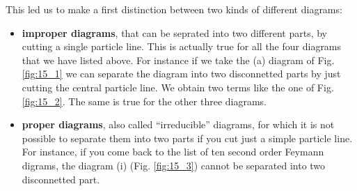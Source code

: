 \documentclass[../main/main.tex]{subfiles}
\begin{document}
This led us to make a first distinction between two kinds of different diagrams:
\begin{itemize}
\item \textbf{improper diagrams}, that can be seprated into two different parts, by cutting a single particle line. This is actually true for all the four diagrams that we have listed above. For instance if we take the (a) diagram of Fig. \ref{fig:15_1} we can separate the diagram into two disconnetted parts by just cutting the central particle line. We obtain two terms like the one of Fig.\ref{fig:15_2}. The same is true for the other three diagrams.

\item \textbf{proper diagrams}, also called “irreducible” diagrams, for which it is not possible to separate them into two parts if you cut just a simple particle line.
For instance, if you come back to the list of ten second order Feymann digrams, the diagram (i) (Fig. \ref{fig:15_3}) cannot be separated into two disconnetted part.


\end{itemize}
\end{document}
